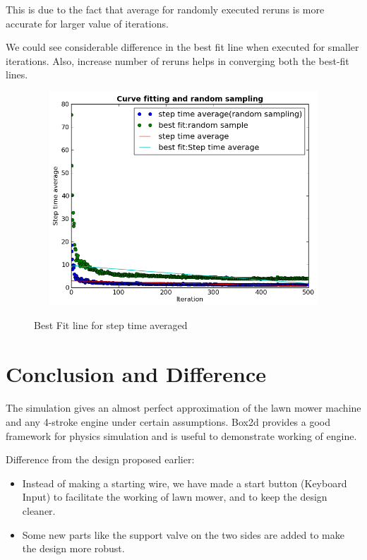 \documentclass[12pt,a4paper]{report}
\begin{document}
This is due to the fact that average for randomly executed reruns is more accurate for larger value of iterations.

We could see considerable difference in the best fit line when executed for smaller iterations. Also, increase number of reruns helps in converging both the best-fit lines.

\begin{figure}
\includegraphics[width=12cm,height=8cm]{g20_project_plot05} 
\label{fig:plt5}
\caption{Best Fit line for step time averaged} 
\end{figure}

\pagebreak
\section*{Conclusion and Difference}
\paragraph{} The simulation gives an almost perfect approximation of the lawn mower machine and any 4-stroke engine under certain assumptions.
Box2d provides a good framework for physics simulation and is useful to demonstrate working of engine.

Difference from the design proposed earlier:
\begin{itemize}
\item Instead of making a starting wire, we have made a start button (Keyboard Input) to facilitate the working of lawn mower, and to keep the design cleaner.
\item Some new parts like the support valve on the two sides are added to make the design more robust.	\cite{Latex}
\end{itemize}



\end{document}
